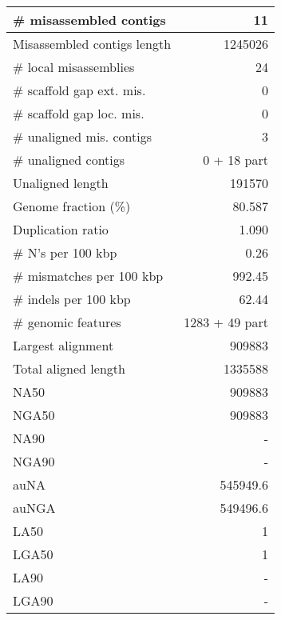 \documentclass[12pt,a4paper]{article}
\begin{document}
\begin{table}[ht]
\begin{center}
\begin{tabular}{|l*{1}{|r}|}
\# misassembled contigs & 11 \\ \hline
Misassembled contigs length & 1245026 \\ \hline
\# local misassemblies & 24 \\ \hline
\# scaffold gap ext. mis. & 0 \\ \hline
\# scaffold gap loc. mis. & 0 \\ \hline
\# unaligned mis. contigs & 3 \\ \hline
\# unaligned contigs & 0 + 18 part \\ \hline
Unaligned length & 191570 \\ \hline
Genome fraction (\%) & 80.587 \\ \hline
Duplication ratio & 1.090 \\ \hline
\# N's per 100 kbp & 0.26 \\ \hline
\# mismatches per 100 kbp & 992.45 \\ \hline
\# indels per 100 kbp & 62.44 \\ \hline
\# genomic features & 1283 + 49 part \\ \hline
Largest alignment & 909883 \\ \hline
Total aligned length & 1335588 \\ \hline
NA50 & 909883 \\ \hline
NGA50 & 909883 \\ \hline
NA90 & - \\ \hline
NGA90 & - \\ \hline
auNA & 545949.6 \\ \hline
auNGA & 549496.6 \\ \hline
LA50 & 1 \\ \hline
LGA50 & 1 \\ \hline
LA90 & - \\ \hline
LGA90 & - \\ \hline
\end{tabular}
\end{center}
\end{table}
\end{document}
